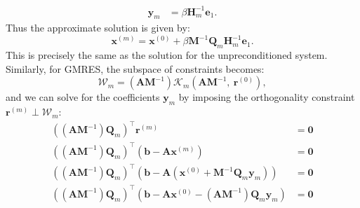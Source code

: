 \documentclass{article}
\begin{document}
\begin{appendix}
\begin{align*}
        \symbf{y}_m                                                                                                                                          & = \beta \symbf{H}_m^{-1} \symbf{e}_1.
    \end{align*}
    Thus the approximate solution is given by:
    \begin{equation*}
        \symbf{x}^{\left( m \right)} = \symbf{x}^{\left( 0 \right)} + \beta \symbf{M}^{-1} \symbf{Q}_m \symbf{H}_m^{-1} \symbf{e}_1.
    \end{equation*}
    This is precisely the same as the solution for the unpreconditioned
    system. Similarly, for GMRES, the subspace of constraints becomes:
    \begin{equation*}
        \mathcal{W}_m = \left( \symbf{A} \symbf{M}^{-1} \right) \mathcal{K}_m\left( \symbf{A} \symbf{M}^{-1},\: \symbf{r}^{\left( 0 \right)} \right),
    \end{equation*}
    and we can solve for the coefficients \(\symbf{y}_m\) by imposing the
    orthogonality constraint \(\symbf{r}^{\left( m \right)} \perp \mathcal{W}_m\):
    \begin{align*}
        \left( \left( \symbf{A} \symbf{M}^{-1} \right) \symbf{Q}_m \right)^\top \symbf{r}^{\left( m \right)}                                                                                                        & = \symbf{0}                                                                                             \\
        \left( \left( \symbf{A} \symbf{M}^{-1} \right) \symbf{Q}_m \right)^\top \left( \symbf{b} - \symbf{A} \symbf{x}^{\left( m \right)} \right)                                                                   & = \symbf{0}                                                                                             \\
        \left( \left( \symbf{A} \symbf{M}^{-1} \right) \symbf{Q}_m \right)^\top \left( \symbf{b} - \symbf{A} \left( \symbf{x}^{\left( 0 \right)} + \symbf{M}^{-1} \symbf{Q}_m \symbf{y}_m \right) \right)           & = \symbf{0}                                                                                             \\
        \left( \left( \symbf{A} \symbf{M}^{-1} \right) \symbf{Q}_m \right)^\top \left( \symbf{b} - \symbf{A} \symbf{x}^{\left( 0 \right)} - \left( \symbf{A} \symbf{M}^{-1} \right) \symbf{Q}_m \symbf{y}_m \right) & = \symbf{0}                                                                                             \\

\end{align*}
\end{appendix}
\end{document}
